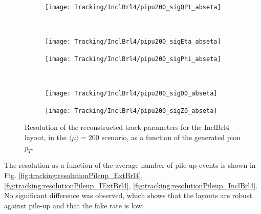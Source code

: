 \documentclass[a4paper,twoside,12pt]{book}
\begin{document}
\begin{figure}
\begin{subfigure}{\linewidth}
\centering
\texttt{[image: Tracking/InclBrl4/pipu200\_sigQPt\_abseta]}
\caption{}
\label{fig:tracking:pipu200_sigQPt_abseta}
\end{subfigure}\\[1ex]
\begin{subfigure}{.5\linewidth}
\texttt{[image: Tracking/InclBrl4/pipu200\_sigEta\_abseta]}
\caption{}
\label{fig:tracking:pipu200_sigEta_abseta}
\end{subfigure}
\begin{subfigure}{.5\linewidth}
\texttt{[image: Tracking/InclBrl4/pipu200\_sigPhi\_abseta]}
\caption{}
\label{fig:tracking:pipu200_sigPhi_abseta}
\end{subfigure}\\[1ex]
\begin{subfigure}{.5\linewidth}
\texttt{[image: Tracking/InclBrl4/pipu200\_sigD0\_abseta]}
\caption{}
\label{fig:tracking:pipu200_sigD0_abseta}
\end{subfigure}
\begin{subfigure}{.5\linewidth}
\texttt{[image: Tracking/InclBrl4/pipu200\_sigZ0\_abseta]}
\caption{}
\label{fig:tracking:pipu200_sigZ0_abseta}
\end{subfigure}
\caption{Resolution of the reconstructed track parameters for the InclBrl4 layout, in the $\langle\mu\rangle = 200$ scenario, as a function of the generated pion $p_{T}$.}
\label{fig:tracking:pionResolutionPt}
\end{figure}

The resolution as a function of the average number of pile-up events is shown in Fig. \ref{fig:tracking:resolutionPileup_ExtBrl4}, \ref{fig:tracking:resolutionPileup_IExtBrl4}, \ref{fig:tracking:resolutionPileup_InclBrl4}. No significant difference was observed, 
which shows that the layouts are robust against pile-up and that the fake rate is low.\\
\end{document}
